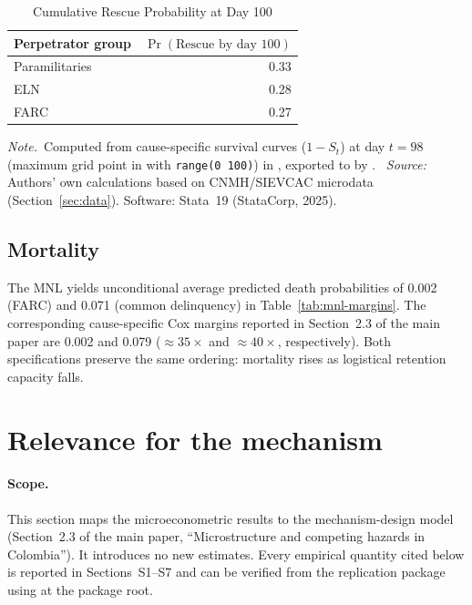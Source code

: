\documentclass[ecta,nameyear,final,supplement]{econsocart}
\numberwithin{equation}{section}
\numberwithin{table}{section}
\newcommand{\tabnote}{\par\addvspace{0.4em}\noindent\emph{Note.}}
\newcommand{\tabsource}{\ \textit{Source:} Authors' own calculations based on
CNMH/SIEVCAC microdata (Section~\ref{sec:data}). Software: Stata~19
(StataCorp, 2025).}
\begin{document}
\begin{table}[t]
\centering
\caption{Cumulative Rescue Probability at Day 100}
\label{tab:cox-cumul}
\small
\begin{tabular}{@{}lr@{}}
\toprule
Perpetrator group & $\Pr(\text{Rescue by day 100})$ \\
\midrule
Paramilitaries & 0.33 \\
ELN & 0.28 \\
FARC & 0.27 \\
\bottomrule
\end{tabular}
\tabnote\ Computed from cause-specific survival curves ($1-S_t$) at day
$t=98$ (maximum grid point in  with \texttt{range(0 100)}) in
, exported to
 by .
\tabsource
\end{table}

\subsection{Mortality}

The MNL yields unconditional average predicted death probabilities of 0.002
(FARC) and 0.071 (common delinquency) in Table~\ref{tab:mnl-margins}. The
corresponding cause-specific Cox margins reported in Section~2.3 of the main
paper are 0.002 and 0.079 (${\approx}35\times$ and ${\approx}40\times$,
respectively). Both specifications preserve the same ordering: mortality rises
as logistical retention capacity falls.

\section{Relevance for the mechanism}
\label{sec:relevance}

\paragraph{Scope.}
This section maps the microeconometric results to the mechanism-design model
(Section~2.3 of the main paper, ``Microstructure and competing hazards in
Colombia''). It introduces no new estimates. Every empirical quantity cited
below is reported in Sections~S1--S7 and can be verified from the replication
package using  at the package root.
\end{document}
